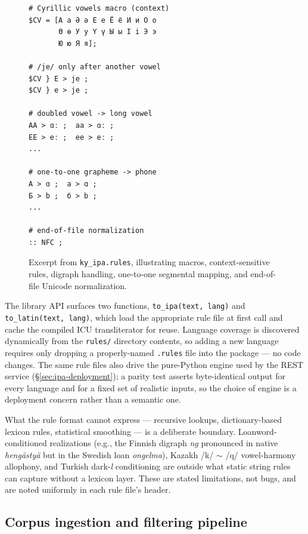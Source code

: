 \begin{figure}[t]
\small
\begin{verbatim}
# Cyrillic vowels macro (context)
$CV = [А а Ә ә Е е Ё ё И и О о
       Ө ө У у Ү ү Ы ы I i Э э
       Ю ю Я я];

# /je/ only after another vowel
$CV } Е > je ;
$CV } е > je ;

# doubled vowel -> long vowel
АА > ɑː ;  аа > ɑː ;
ЕЕ > eː ;  ее > eː ;
...

# one-to-one grapheme -> phone
А > ɑ ;  а > ɑ ;
Б > b ;  б > b ;
...

# end-of-file normalization
:: NFC ;
\end{verbatim}
\caption{Excerpt from \texttt{ky\_ipa.rules}, illustrating macros, context-sensitive rules, digraph handling, one-to-one segmental mapping, and end-of-file Unicode normalization.}
\label{fig:kk-excerpt}
\end{figure}

The library API surfaces two functions, \texttt{to\_ipa(text, lang)} and \texttt{to\_latin(text, lang)}, which load the appropriate rule file at first call and cache the compiled ICU transliterator for reuse. Language coverage is discovered dynamically from the \texttt{rules/} directory contents, so adding a new language requires only dropping a properly-named \texttt{.rules} file into the package — no code changes. The same rule files also drive the pure-Python engine used by the REST service (\S\ref{sec:ipa-deployment}); a parity test asserts byte-identical output for every language and for a fixed set of realistic inputs, so the choice of engine is a deployment concern rather than a semantic one.

What the rule format cannot express — recursive lookups, dictionary-based lexicon rules, statistical smoothing — is a deliberate boundary. Loanword-conditioned realizations (e.g., the Finnish digraph \emph{ng} pronounced \textipa{[NN]} in native \emph{hengästyä} but \textipa{[Ng]} in the Swedish loan \emph{ongelma}), Kazakh /k/ $\sim$ /q/ vowel-harmony allophony, and Turkish dark-\emph{l} conditioning are outside what static string rules can capture without a lexicon layer. These are stated limitations, not bugs, and are noted uniformly in each rule file's header.

\subsection{Corpus ingestion and filtering pipeline}
\label{sec:ipa-pipeline}

